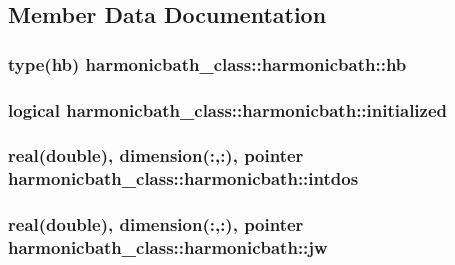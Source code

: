 \subsection{Member Data Documentation}
\hypertarget{structharmonicbath__class_1_1harmonicbath_a7b59e71a4b2100f821d091a5193d50f5}{
\subsubsection[{hb}]{\setlength{\rightskip}{0pt plus 5cm}type(hb) harmonicbath\+\_\+class\+::harmonicbath\+::hb\hspace{0.3cm}{\ttfamily [private]}}}\label{structharmonicbath__class_1_1harmonicbath_a7b59e71a4b2100f821d091a5193d50f5}
\hypertarget{structharmonicbath__class_1_1harmonicbath_a876fbdf98da8f3bfeb4b4e03b58d6f74}{
\subsubsection[{initialized}]{\setlength{\rightskip}{0pt plus 5cm}logical harmonicbath\+\_\+class\+::harmonicbath\+::initialized\hspace{0.3cm}{\ttfamily [private]}}}\label{structharmonicbath__class_1_1harmonicbath_a876fbdf98da8f3bfeb4b4e03b58d6f74}
\hypertarget{structharmonicbath__class_1_1harmonicbath_aded5880e44b831dddae5be30966594e4}{
\subsubsection[{intdos}]{\setlength{\rightskip}{0pt plus 5cm}real(double), dimension(\+:,\+:), pointer harmonicbath\+\_\+class\+::harmonicbath\+::intdos\hspace{0.3cm}{\ttfamily [private]}}}\label{structharmonicbath__class_1_1harmonicbath_aded5880e44b831dddae5be30966594e4}
\hypertarget{structharmonicbath__class_1_1harmonicbath_a5d4365532fe5feb53eb8bf06a64c8bcc}{
\subsubsection[{jw}]{\setlength{\rightskip}{0pt plus 5cm}real(double), dimension(\+:,\+:), pointer harmonicbath\+\_\+class\+::harmonicbath\+::jw\hspace{0.3cm}{\ttfamily [private]}}}\label{structharmonicbath__class_1_1harmonicbath_a5d4365532fe5feb53eb8bf06a64c8bcc}
